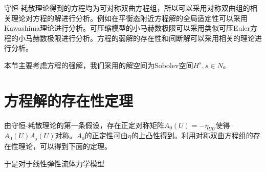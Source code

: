 \documentclass{article}
\newtheorem{theorem}{定理}
\begin{document}
	守恒-耗散理论得到的方程均为可对称双曲方程组，所以可以采用对称双曲组的相关理论对方程的解进行分析。例如在平衡态附近方程解的全局适定性可以采用Kawashima理论进行分析\cite{}。可压缩模型的小马赫数极限可以采用类似可压Euler方程的小马赫数极限进行分析\cite{}。方程的弱解的存在性和间断解可以采用相关的理论进行分析\cite{}。

	本节主要考虑方程的强解，我们采用的解空间为Sobolev空间$H^s, s \in N$。

	\section{方程解的存在性定理}
	由守恒-耗散理论的第一条假设，存在正定对称矩阵$A_0(U)  = -\eta_{UU}$使得$A_0(U) A_j(U)$对称。$A_0$的正定性可由$\eta$的上凸性得到。利用对称双曲方程组的存在性理论，可以得到下面的定理\cite{}。

	于是对于线性弹性流体力学模型
	
\end{document}

